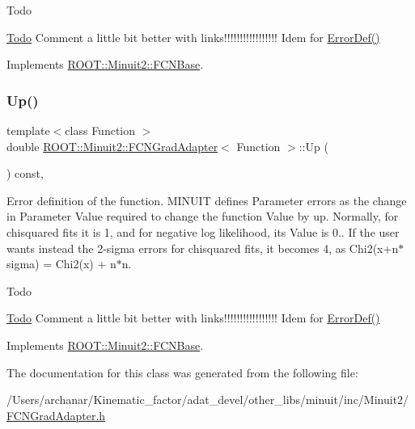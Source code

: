 \begin{DoxyRefDesc}{Todo}
\item[\mbox{\hyperlink{todo__todo000001}{Todo}}]Comment a little bit better with links!!!!!!!!!!!!!!!!! Idem for \mbox{\hyperlink{classROOT_1_1Minuit2_1_1FCNBase_ac4592475c58a65b037ba97ab5f3cba10}{Error\+Def()}}\end{DoxyRefDesc}


Implements \mbox{\hyperlink{classROOT_1_1Minuit2_1_1FCNBase_a04ef08ddad92ce8d89d498efbe021c39}{R\+O\+O\+T\+::\+Minuit2\+::\+F\+C\+N\+Base}}.

\mbox{\label{classROOT_1_1Minuit2_1_1FCNGradAdapter_a99e41f07b3f7374c0b17ef42f1c15a19}} 
\subsubsection{\texorpdfstring{Up()}{Up()}\hspace{0.1cm}{\footnotesize\ttfamily [2/2]}}
{\footnotesize\ttfamily template$<$class Function $>$ \\
double \mbox{\hyperlink{classROOT_1_1Minuit2_1_1FCNGradAdapter}{R\+O\+O\+T\+::\+Minuit2\+::\+F\+C\+N\+Grad\+Adapter}}$<$ Function $>$\+::Up (\begin{DoxyParamCaption}{ }\end{DoxyParamCaption}) const\hspace{0.3cm}{\ttfamily [inline]}, {\ttfamily [virtual]}}

Error definition of the function. M\+I\+N\+U\+IT defines Parameter errors as the change in Parameter Value required to change the function Value by up. Normally, for chisquared fits it is 1, and for negative log likelihood, its Value is 0.. If the user wants instead the 2-\/sigma errors for chisquared fits, it becomes 4, as Chi2(x+n$\ast$sigma) = Chi2(x) + n$\ast$n.

\begin{DoxyRefDesc}{Todo}
\item[\mbox{\hyperlink{todo__todo000001}{Todo}}]Comment a little bit better with links!!!!!!!!!!!!!!!!! Idem for \mbox{\hyperlink{classROOT_1_1Minuit2_1_1FCNBase_ac4592475c58a65b037ba97ab5f3cba10}{Error\+Def()}}\end{DoxyRefDesc}


Implements \mbox{\hyperlink{classROOT_1_1Minuit2_1_1FCNBase_a04ef08ddad92ce8d89d498efbe021c39}{R\+O\+O\+T\+::\+Minuit2\+::\+F\+C\+N\+Base}}.



The documentation for this class was generated from the following file\+:\begin{DoxyCompactItemize}
\item 
/\+Users/archanar/\+Kinematic\+\_\+factor/adat\+\_\+devel/other\+\_\+libs/minuit/inc/\+Minuit2/\mbox{\hyperlink{other__libs_2minuit_2inc_2Minuit2_2FCNGradAdapter_8h}{F\+C\+N\+Grad\+Adapter.\+h}}\end{DoxyCompactItemize}
